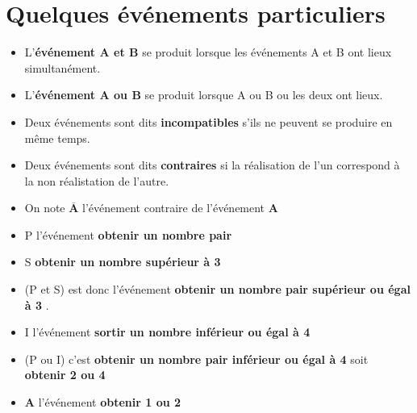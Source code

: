 \section{Quelques événements particuliers}
\begin{definition}
    \begin{itemize}
        \item L'\textbf{événement \og A et B\fg{}  } se produit lorsque les événements A et B ont lieux simultanément.
        \item L'\textbf{événement \og A ou B\fg{}  } se produit lorsque A ou B ou les deux ont lieux.
        \item Deux événements sont dits \textbf{incompatibles} s'ils ne peuvent se produire en même temps.
        \item Deux événements sont dits \textbf{contraires} si la réalisation de l'un correspond à la non réalistation de l'autre.
        \item On note $\mathbf{\overline{A}}$ l'événement contraire de l'événement $\mathbf{A}$
    \end{itemize}
\end{definition}

\begin{exemples*1}

    \begin{itemize}
        \item P l'événement \textbf{\og obtenir un nombre pair\fg{}  }
        \item S \textbf{\og obtenir un nombre supérieur à 3\fg{}  }
        \item (P et S) est donc l'événement \textbf{\og obtenir un nombre pair supérieur ou égal à 3\fg{}  }.
        \item I l'événement \textbf{\og sortir un nombre inférieur ou égal à 4\fg{}  }
        \item (P ou I) c'est \textbf{\og obtenir un nombre pair inférieur ou égal à 4\fg{}  } soit \textbf{\og obtenir 2 ou 4\fg{}  }  
        \item \textbf{A} l'événement \textbf{\og obtenir 1 ou 2\fg{}  }
    \end{itemize}
\end{exemples*1}
